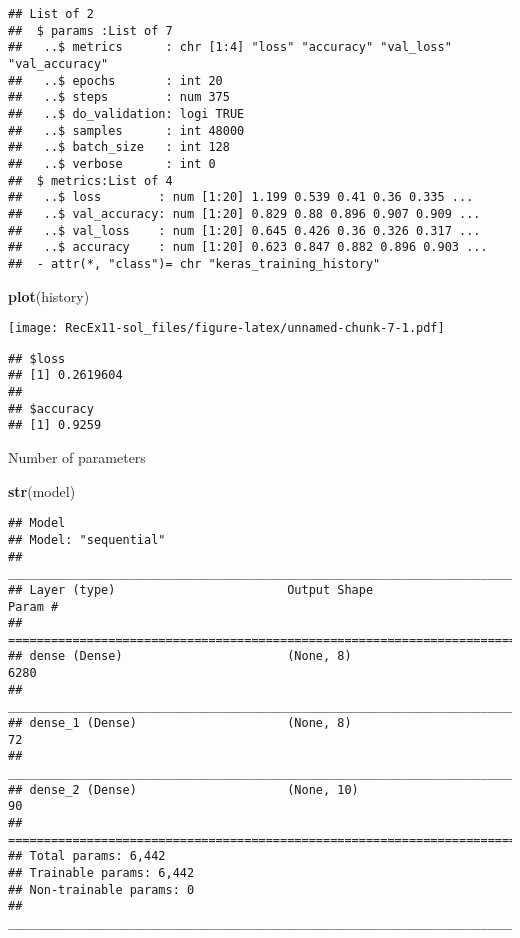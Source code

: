 \documentclass[]{article}
\newenvironment{Shaded}{\begin{snugshade}}{\end{snugshade}}
\newcommand{\KeywordTok}[1]{\textcolor[rgb]{0.13,0.29,0.53}{\textbf{#1}}}
\newcommand{\NormalTok}[1]{#1}
\newcommand{\OperatorTok}[1]{\textcolor[rgb]{0.81,0.36,0.00}{\textbf{#1}}}
\newcommand{\StringTok}[1]{\textcolor[rgb]{0.31,0.60,0.02}{#1}}
\begin{document}
\begin{verbatim}
## List of 2
##  $ params :List of 7
##   ..$ metrics      : chr [1:4] "loss" "accuracy" "val_loss" "val_accuracy"
##   ..$ epochs       : int 20
##   ..$ steps        : num 375
##   ..$ do_validation: logi TRUE
##   ..$ samples      : int 48000
##   ..$ batch_size   : int 128
##   ..$ verbose      : int 0
##  $ metrics:List of 4
##   ..$ loss        : num [1:20] 1.199 0.539 0.41 0.36 0.335 ...
##   ..$ val_accuracy: num [1:20] 0.829 0.88 0.896 0.907 0.909 ...
##   ..$ val_loss    : num [1:20] 0.645 0.426 0.36 0.326 0.317 ...
##   ..$ accuracy    : num [1:20] 0.623 0.847 0.882 0.896 0.903 ...
##  - attr(*, "class")= chr "keras_training_history"
\end{verbatim}

\begin{Shaded}
\begin{Highlighting}[]
\KeywordTok{plot}\NormalTok{(history)}
\end{Highlighting}
\end{Shaded}

\texttt{[image: RecEx11-sol\_files/figure-latex/unnamed-chunk-7-1.pdf]}

\begin{Shaded}
\end{Shaded}

\begin{verbatim}
## $loss
## [1] 0.2619604
## 
## $accuracy
## [1] 0.9259
\end{verbatim}

Number of parameters

\begin{Shaded}
\begin{Highlighting}[]
\KeywordTok{str}\NormalTok{(model)}
\end{Highlighting}
\end{Shaded}

\begin{verbatim}
## Model
## Model: "sequential"
## ________________________________________________________________________________
## Layer (type)                        Output Shape                    Param #     
## ================================================================================
## dense (Dense)                       (None, 8)                       6280        
## ________________________________________________________________________________
## dense_1 (Dense)                     (None, 8)                       72          
## ________________________________________________________________________________
## dense_2 (Dense)                     (None, 10)                      90          
## ================================================================================
## Total params: 6,442
## Trainable params: 6,442
## Non-trainable params: 0
## ________________________________________________________________________________
\end{verbatim}
\end{document}
